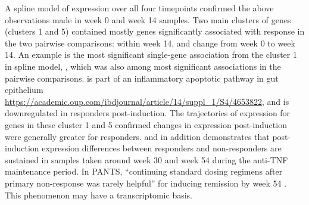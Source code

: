 A spline model of expression over all four timepoints confirmed the above observations made in week 0 and week 14 samples.
Two main clusters of genes (clusters 1 and 5) contained mostly genes significantly associated with response in the two pairwise comparisons: within week 14, and change from week 0 to week 14.
An example is the most significant single-gene association from the cluster 1 in spline model, , 
which was also among most significant associations in the pairwise comparisons.
 is part of an inflammatory apoptotic pathway in gut epithelium \url{https://academic.oup.com/ibdjournal/article/14/suppl_1/S4/4653822}, 
and is downregulated in responders post-induction.
The trajectories of expression for genes in these cluster 1 and 5 confirmed changes in expression post-induction were generally greater for responders.
and in addition demonstrates that post-induction expression differences between responders and non-responders are sustained
in samples taken around week 30 and week 54 during the anti-\gls{TNF} maintenance period.
In \gls{PANTS}, \enquote{continuing standard dosing regimens after primary non-response was rarely helpful} for inducing remission by week 54 \autocite{kennedy2019PredictorsAntiTNFTreatment}.
This phenomenon may have a transcriptomic basis.

